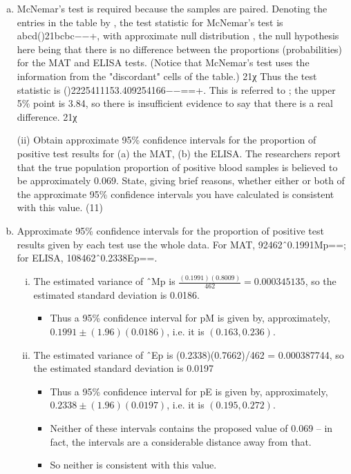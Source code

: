\documentclass[a4paper,12pt]{article}
\begin{document}
\begin{enumerate}[(a)]
    \item McNemar's test is required because the samples are paired.
Denoting the entries in the table by , the test statistic for McNemar's test is abcd()21bcbc−−+, with approximate null distribution , the null hypothesis here being that there is no difference between the proportions (probabilities) for the MAT and ELISA tests. (Notice that McNemar's test uses the information from the "discordant" cells of the table.) 21χ
Thus the test statistic is ()2225411153.409254166−−==+. This is referred to ; the upper 5\% point is 3.84, so there is insufficient evidence to say that there is a real difference. 21χ
\newpage
\begin{framed}
(ii) Obtain approximate 95\% confidence intervals for the proportion of positive test results for 
 (a) the MAT, 
 (b) the ELISA. 
 The researchers report that the true population proportion of positive blood samples is believed to be approximately 0.069.  State, giving brief reasons, whether either or both of the approximate 95\% confidence intervals you have calculated is consistent with this value. (11) 
 \end{framed}

    \item  Approximate 95\% confidence intervals for the proportion of positive test results given by each test use the whole data. For MAT, 92462ˆ0.1991Mp==; for ELISA, 108462ˆ0.2338Ep==.
    
\begin{enumerate}[(i)]
    \item  The estimated variance of ˆMp is $\displaystyle{\frac{(0.1991)(0.8009)}{462} = 0.000345135}$, so the estimated standard deviation is 0.0186.
    \begin{itemize}
        \item Thus a 95\% confidence interval for pM is given by, approximately, $0.1991 \pm (1.96)(0.0186)$, i.e. it is $(0.163, 0.236)$.
    \end{itemize} 
\item The estimated variance of ˆEp is (0.2338)(0.7662)/462 = 0.000387744, so the estimated standard deviation is 0.0197 
\begin{itemize}
\item Thus a 95\% confidence interval for pE is given by, approximately, $0.2338 \pm (1.96)(0.0197)$, i.e. it is $(0.195, 0.272)$.
\item Neither of these intervals contains the proposed value of 0.069 – in fact, the intervals are a considerable distance away from that. 
\item So neither is consistent with this value.
\end{itemize}
\end{enumerate}

\end{enumerate}
\end{document}
